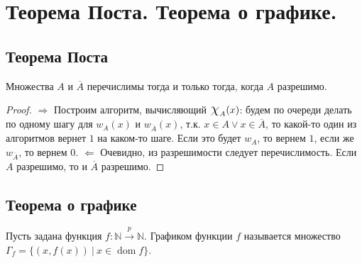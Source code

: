 \section{Теорема Поста. Теорема о графике.}

\subsection{Теорема Поста}

\begin{theorem}
  Множества $A$ и $\overline{A}$ перечислимы тогда и только тогда, когда $A$ разрешимо.
  \begin{proof}
    $\Rightarrow$ \newline
    Построим алгоритм, вычисляющий $\mbox{\Large$\chi$}_A(x)$: будем по очереди делать по одному шагу для $w_A(x)$ и $w_{\overline{A}}(x)$, т.к. $x \in A \vee x \in \overline{A}$, то какой-то один из алгоритмов вернет $1$ на каком-то шаге. Если это будет $w_A$, то вернем $1$, если же $w_{\overline{A}}$, то вернем $0$. \newline
    $\Leftarrow$ \newline
    Очевидно, из разрешимости следует перечислимость. Если $A$ разрешимо, то и $\overline{A}$ разрешимо.
  \end{proof}
\end{theorem}

\subsection{Теорема о графике}

\begin{definition}
  Пусть задана функция $f : \mathbb{N} \overset{p}{\to} \mathbb{N}$. Графиком функции $f$ называется множество $\Gamma_f = \{(x, f(x)) \> | \> x \in \operatorname{dom} f\}$.
\end{definition}

